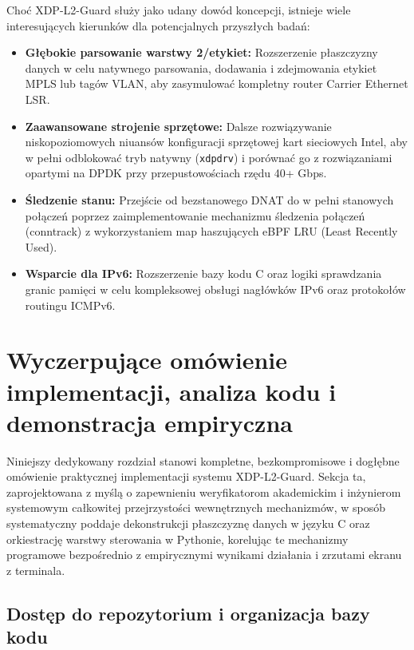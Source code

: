 \documentclass[11pt,a4paper]{article}
\begin{document}
Choć XDP-L2-Guard służy jako udany dowód koncepcji, istnieje wiele interesujących kierunków dla potencjalnych przyszłych badań:
\begin{itemize}
    \item \textbf{Głębokie parsowanie warstwy 2/etykiet:} Rozszerzenie płaszczyzny danych w celu natywnego parsowania, dodawania i zdejmowania etykiet MPLS lub tagów VLAN, aby zasymulować kompletny router Carrier Ethernet LSR.
    \item \textbf{Zaawansowane strojenie sprzętowe:} Dalsze rozwiązywanie niskopoziomowych niuansów konfiguracji sprzętowej kart sieciowych Intel, aby w pełni odblokować tryb natywny (\texttt{xdpdrv}) i porównać go z rozwiązaniami opartymi na DPDK przy przepustowościach rzędu 40+ Gbps.
    \item \textbf{Śledzenie stanu:} Przejście od bezstanowego DNAT do w pełni stanowych połączeń poprzez zaimplementowanie mechanizmu śledzenia połączeń (conntrack) z wykorzystaniem map haszujących eBPF LRU (Least Recently Used).
    \item \textbf{Wsparcie dla IPv6:} Rozszerzenie bazy kodu C oraz logiki sprawdzania granic pamięci w celu kompleksowej obsługi nagłówków IPv6 oraz protokołów routingu ICMPv6.
\end{itemize}

\newpage
\color{black} %

\section{Wyczerpujące omówienie implementacji, analiza kodu i demonstracja empiryczna}

Niniejszy dedykowany rozdział stanowi kompletne, bezkompromisowe i dogłębne omówienie praktycznej implementacji systemu XDP-L2-Guard. Sekcja ta, zaprojektowana z myślą o zapewnieniu weryfikatorom akademickim i inżynierom systemowym całkowitej przejrzystości wewnętrznych mechanizmów, w sposób systematyczny poddaje dekonstrukcji płaszczyznę danych w języku C oraz orkiestrację warstwy sterowania w Pythonie, korelując te mechanizmy programowe bezpośrednio z empirycznymi wynikami działania i zrzutami ekranu z terminala.

\subsection{Dostęp do repozytorium i organizacja bazy kodu}
\end{document}
